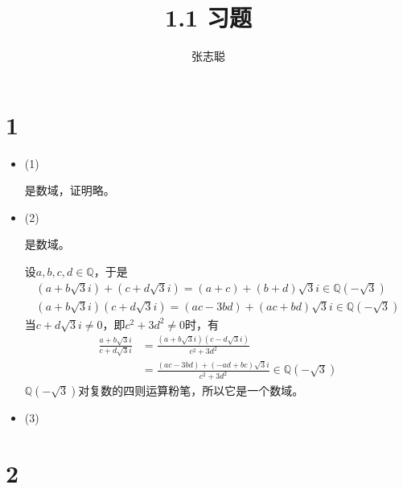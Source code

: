 \documentclass{article}
\begin{document}
\title{1.1 习题}
\author{张志聪}
\maketitle

\section*{1}

\begin{itemize}
    \item (1)

          是数域，证明略。
    \item (2)

          是数域。

          设$a, b, c, d \in \mathbb{Q}$，于是
          \begin{align*}
              (a + b\sqrt{3}i) + (c + d\sqrt{3}i) = (a + c) + (b + d)\sqrt{3}i \in \mathbb{Q}(-\sqrt{3}) \\
              (a + b\sqrt{3}i) (c + d\sqrt{3}i) = (ac - 3bd) + (ac + bd)\sqrt{3}i \in \mathbb{Q}(-\sqrt{3})
          \end{align*}
          当$c + d\sqrt{3}i \neq 0$，即$c^2 + 3d^2 \neq 0$时，有
          \begin{align*}
              \frac{a + b\sqrt{3}i}{c + d\sqrt{3}i}
               & = \frac{(a + b\sqrt{3}i)(c - d\sqrt{3}i)}{c^2 + 3d^2}                           \\
               & = \frac{(ac - 3bd) + (-ad + bc)\sqrt{3}i}{c^2 + 3d^2} \in \mathbb{Q}(-\sqrt{3})
          \end{align*}
          $\mathbb{Q}(-\sqrt{3})$对复数的四则运算粉笔，所以它是一个数域。

    \item (3)



\end{itemize}

\section*{2}
\end{document}
